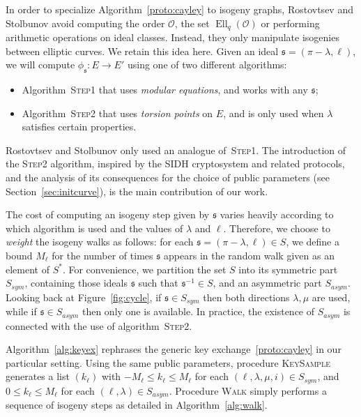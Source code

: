 \documentclass{article}
\renewcommand{\O}{\mathcal{O}}
\newcommand{\algstyle}[1]{\textsc{#1}}
\renewcommand{\frak}{\mathfrak}
\theoremstyle{definition}
\DeclareMathOperator{\Ell}{Ell}
\begin{document}
In order to specialize Algorithm~\ref{proto:cayley} to isogeny graphs,
Rostovtsev and Stolbunov avoid computing the order $\O$, the set $\Ell_q(\O)$
or performing arithmetic operations on ideal classes. Instead, they only
manipulate isogenies between elliptic curves. We retain this idea here.
Given an ideal $\frak s = (\pi-\lambda, \ell)$, we will compute $\phi_{\frak s}:E\to E'$
using one of two different algorithms:
\begin{itemize}
\item Algorithm~\algstyle{Step1} that uses
	\emph{modular equations}, and works with any $\frak s$;
\item Algorithm~\algstyle{Step2} that
	uses \emph{torsion points} on $E$, and is only used when
	$\lambda$ satisfies certain properties.
\end{itemize}

Rostovtsev and Stolbunov only used an analogue of~\algstyle{Step1}. 
The introduction of the \algstyle{Step2} algorithm, 
inspired by the SIDH cryptosystem and related protocols, 
and the analysis of its consequences for the choice of public
parameters (see Section~\ref{sec:initcurve}),
is the main contribution of our work.

The cost of computing an isogeny step given by $\frak s$
varies heavily according to which algorithm is used and the values of $\lambda$
and $\ell$. Therefore, we choose to \emph{weight} the isogeny walks as
follows: for each $\frak s = (\pi-\lambda,\ell)\in S$,
we define a bound $M_\ell$ for the number of times $\frak s$
appears in the random walk given as an element of $S^*$.
For convenience, we partition the set $S$
into its symmetric part $S_{sym}$, containing those ideals $\frak s$ such that
$\frak s^{-1}\in S$, and an asymmetric part $S_{asym}$. Looking back at
Figure~\ref{fig:cycle}, if $\frak s\in S_{sym}$ then both directions
$\lambda,\mu$ are used, while if $\frak s\in S_{asym}$ then only one is
available. In practice, the existence of $S_{asym}$ is connected with the use of
algorithm~\algstyle{Step2}.

Algorithm~\ref{alg:keyex} rephrases the generic key exchange~\ref{proto:cayley}
in our particular setting. Using the same public parameters, procedure
\algstyle{KeySample} generates a list $(k_\ell)$ with $-M_\ell\leq k_\ell\leq M_\ell$
for each $(\ell, \lambda, \mu, i)\in S_{sym}$, and $0\leq k_\ell\leq M_\ell$ for
each $(\ell, \lambda)\in S_{asym}$. Procedure \algstyle{Walk} simply performs
a sequence of isogeny steps as detailed in Algorithm~\ref{alg:walk}.
\end{document}
